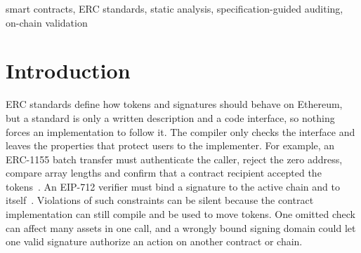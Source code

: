 \documentclass[10pt,conference]{IEEEtran}
\begin{document}
\begin{IEEEkeywords}
smart contracts, ERC standards, static analysis, specification-guided auditing, on-chain validation
\end{IEEEkeywords}

\section{Introduction}
ERC standards define how tokens and signatures should behave on Ethereum, but a standard is only a written description and a code interface, so nothing forces an implementation to follow it.
The compiler only checks the interface and leaves the properties that protect users to the implementer. 
For example, an ERC-1155 batch transfer must
authenticate the caller, reject the zero address, compare array lengths and confirm that a contract recipient accepted the
tokens~\cite{erc1155:misc}. An EIP-712 verifier must bind a signature to the active chain and to itself~\cite{eip712,eip2612}.
Violations of such constraints can be silent because the contract implementation can still compile and be used to move tokens. One omitted check can affect many assets in one call, and a wrongly bound
signing domain could let one valid signature authorize an action on another contract or chain.
\end{document}

